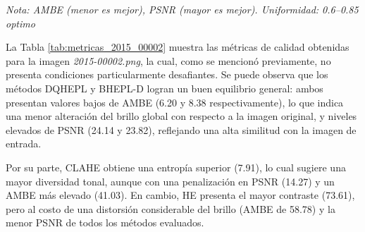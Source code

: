\documentclass[sigchi]{acmart}
\begin{document}
\begin{table}[H]
	\centering
	\caption{Métricas de calidad para la imagen 2015\_00002.png}
	\label{tab:metricas_2015_00002}

	\vspace{0.5em} %


	\vspace{0.5em} %
	\footnotesize%
	\textit{Nota: AMBE (menor es mejor), PSNR (mayor es mejor). Uniformidad: 0.6–0.85 optimo}
\end{table}

La Tabla \ref{tab:metricas_2015_00002} muestra las métricas de calidad obtenidas para la imagen
\emph{2015-00002.png}, la cual, como se mencionó previamente, no presenta condiciones particularmente
desafiantes. Se puede observa que los métodos DQHEPL y BHEPL-D logran un buen
equilibrio general: ambos presentan valores bajos de AMBE (6.20 y 8.38 respectivamente), lo que
indica una menor alteración del brillo global con respecto a la imagen original, y niveles
elevados de PSNR (24.14 y 23.82), reflejando una alta similitud con la imagen de entrada.

Por su parte, CLAHE obtiene una entropía superior (7.91), lo cual sugiere una mayor diversidad
tonal, aunque con una penalización en PSNR (14.27) y un AMBE más elevado (41.03). En cambio, HE
presenta el mayor contraste (73.61), pero al costo de una distorsión considerable del brillo
(AMBE de 58.78) y la menor PSNR de todos los métodos evaluados.
\end{document}
